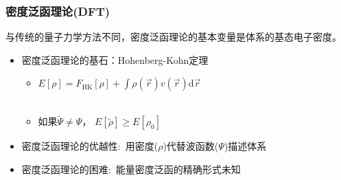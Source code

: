 {\frame                               %
{
\frametitle{密度泛函理论(\textrm{DFT})} %
与传统的量子力学方法不同，密度泛函理论的基本变量是体系的基态电子密度。%
\begin{itemize}%
	\item 密度泛函理论的基石：\textrm{Hohenberg-Kohn}定理
\vskip 5pt
\begin{itemize}%
   \setlength{\itemsep}{8pt}
 \item $E[\rho]=F_{\mathrm{HK}}[\rho]+\displaystyle\int\rho(\vec{r})v(\vec{r})\textrm{d}\vec{r}$ \\
\vskip 5pt 
{\fontsize{7.2pt}{6.2pt}}\\%
\textcolor{magenta}{\fontsize{8.2pt}{6.2pt}\selectfont{第一定理表明多电子体系的性质完全由体系的基态密度决定}}
   \item 如果$\tilde\Psi\neq\Psi$，
     $E[\tilde\rho]\geqslant E[\rho_0]$\\
     \textcolor{magenta}{\fontsize{8.2pt}{6.2pt}\selectfont{第二定理指出基态总能量泛函在体系基态电子密度处取极小值}}
   \end{itemize}
\vskip 8pt
 \item 密度泛函理论的优越性:~用密度($\rho$)代替波函数($\Psi$)描述体系
\vskip 5pt
 \item 密度泛函理论的困难:~能量密度泛函的精确形式未知
   \end{itemize}
}

}
